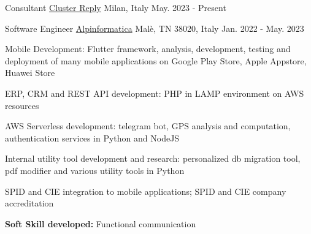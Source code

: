 

\begin{cventries}

  \cventry
    {Consultant} %
    {\href{https://www.reply.com/cluster-reply/}{Cluster Reply}} %
    {Milan, Italy} %
    {May. 2023 - Present} %
    {
    }

  \cventry
    {Software Engineer} %
    {\href{https://www.alpinformatica.com/}{Alpinformatica}} %
    {Malè, TN 38020, Italy} %
    {Jan. 2022 - May. 2023} %
    {
      \begin{cvitems} %
        \item {Mobile Development: Flutter framework, analysis, development, testing and deployment of many mobile applications on Google Play Store, Apple Appstore, Huawei Store }
        \item {ERP, CRM and REST API development: PHP in LAMP environment on AWS resources}
        \item {AWS Serverless development: telegram bot, GPS analysis and computation, authentication services in Python and NodeJS}
        \item {Internal utility tool development and research: personalized db migration tool, pdf modifier and various utility tools in Python}
        \item {SPID and CIE integration to mobile applications; SPID and CIE company accreditation}
        \item {\textbf{Soft Skill developed:} Functional communication}
      \end{cvitems}
    }


\end{cventries}
